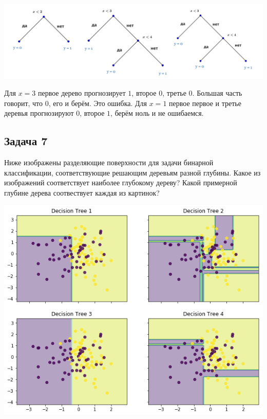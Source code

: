 \documentclass[12pt, a4paper, oneside]{article}
\begin{document}
{\begin{enumerate}
\begin{center}
	\includegraphics[scale=0.17]{forest.png}
\end{center} 	

Для $x=3$ первое дерево прогнозирует $1$, второе $0$, третье $0$. Большая часть говорит, что $0$, его и берём. Это ошибка. Для $x=1$ первое первое и третье деревья прогнозируют $0$, второе $1$, берём ноль и не ошибаемся. 
\end{enumerate}

}



\subsection*{Задача 7} 

Ниже изображены разделяющие поверхности для задачи бинарной классификации, соответствующие решающим деревьям разной глубины. Какое из изображений соответствует наиболее глубокому дереву? Какой примерной глубине дерева соотвествует каждая из картинок? 

\begin{center}
	\includegraphics[scale=0.6]{trees.png}
\end{center}
\end{document}
